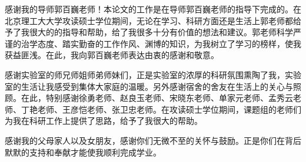 

\begin{thanks}

感谢我的导师郭百巍老师！本论文的工作是在导师郭百巍老师的指导下完成的。在北京理工大大学攻读硕士学位期间，无论在学习、科研方面还是生活上郭老师都给予了我很大的的指导和帮助，给了我很多十分有价值的想法和建议。郭老师科学严谨的治学态度、踏实勤奋的工作作风、渊博的知识，为我树立了学习的榜样，使我获益匪浅。在此，我向郭百巍老师表达由衷的感谢和敬意。

感谢实验室的师兄师姐师弟师妹们，正是实验室的浓厚的科研氛围熏陶了我，实验室的生活让我感受到集体大家庭的温暖。另外感谢宿舍的舍友在生活上的关心与照顾。在此，特别感谢徐勇老师、赵良玉老师、宋晓东老师、单家元老师、孟秀云老师、丁艳老师、王彦恺老师、张卫忠老师。在攻读硕士学位期间，课题组的老师们为我在科研工作上提供了思路，给予了我很大的帮助。

感谢我的父母家人以及女朋友，感谢你们无微不至的关怀与鼓励。正是你们在背后默默的支持和奉献才能使我顺利完成学业。

\end{thanks}
